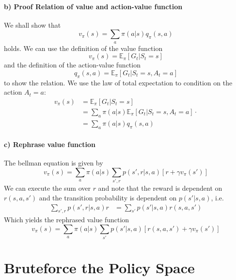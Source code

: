 \documentclass{article}
\begin{document}
\paragraph*{b) Proof Relation of value and action-value function}

We shall show that 
\begin{equation}
    v_\pi(s) = \sum_a \pi(a|s) q_\pi(s,a)
\end{equation}
holds. We can use the definition of the value function
\begin{equation}
    v_\pi(s) = \mathbb{E}_\pi[G_t | S_t = s]
\end{equation}
and the definition of the action-value function
\begin{equation}
    q_\pi(s,a) = \mathbb{E}_\pi[G_t | S_t = s, A_t = a]
\end{equation}
to show the relation. We use the law of total expectation to condition on the action $A_t = a$:
\begin{align}
    v_\pi(s) &= \mathbb{E}_\pi[G_t | S_t = s] \\
       &= \sum_a \pi(a|s) \mathbb{E}_\pi[G_t | S_t = s, A_t = a] \cdot \\
       &= \sum_a \pi(a|s) q_\pi(s,a)
\end{align}


\paragraph*{c) Rephrase value function}

The bellman equation is given by
\begin{equation}
    v_\pi(s) = \sum_a \pi(a|s) \sum_{s',r} p(s',r|s,a) [r + \gamma v_\pi(s')]
\end{equation}
We can execute the sum over $r$ and note that the reward is dependent on $r(s, a, s')$ and the transition probability is dependent on $p(s'|s,a)$, i.e.
\begin{align}
    \sum_{s',r} p(s',r|s,a) r &= \sum_{s'} p(s'|s,a) r(s, a, s')
\end{align}
Which yields the rephrased value function
\begin{equation}
    v_\pi(s) = \sum_a \pi(a|s) \sum_{s'} p(s'|s,a) [r(s, a, s') + \gamma v_\pi(s')]
\end{equation}



\section{Bruteforce the Policy Space}
\end{document}
